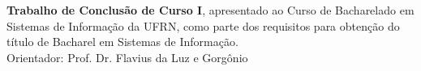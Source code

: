 

\thispagestyle{empty}
\newpage

\begin{center}
    \large{\imprimirautor}\\[4cm] 
    \large{\imprimirtitulo}\\[5cm] 
    
    \hfill
    \begin{minipage}{.5\linewidth}
        \small \textbf{Trabalho de Conclusão de Curso I}, apresentado ao Curso de Bacharelado em Sistemas de Informação da UFRN, como parte dos requisitos para obtenção do título de Bacharel em Sistemas de Informação.
        \\ [0.6cm]
        \small Orientador: Prof. Dr. Flavius da Luz e Gorgônio 
    \end{minipage}
    \\ [6.3cm]

    \large{\imprimirlocal}\\
    \large{\imprimirdata}
\end{center}

